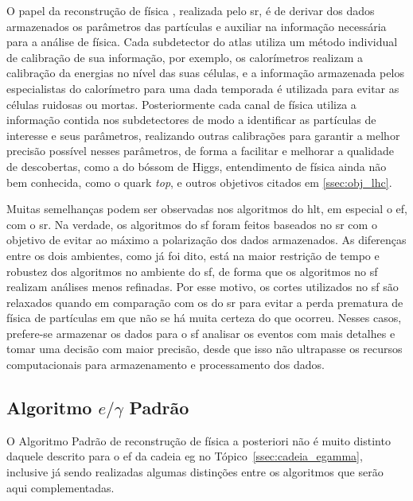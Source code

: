 O papel da reconstrução de física \cite{physics_perf_expected,atlas_computing_tdr}, 
realizada pelo \gls{sr}, é de derivar dos dados armazenados os parâmetros das partículas 
e auxiliar na informação necessária para a análise de física. 
Cada subdetector do \gls{atlas} utiliza um método individual de calibração de
sua informação, por exemplo, os calorímetros realizam a calibração da energias no
nível das suas células, e a informação armazenada pelos especialistas do
calorímetro para uma dada temporada é utilizada para evitar as células ruidosas ou mortas. 
Posteriormente cada canal de física utiliza a informação contida nos
subdetectores de modo a identificar as partículas de interesse e seus
parâmetros, realizando outras calibrações para garantir a melhor precisão
possível nesses parâmetros, de forma a facilitar e melhorar a qualidade de
descobertas, como a do bóssom de Higgs, entendimento de física ainda não bem
conhecida, como o quark \emph{top}, e outros objetivos citados em
\ref{ssec:obj_lhc}.

Muitas semelhanças podem ser observadas nos algoritmos do \gls{hlt}, em especial o
\gls{ef}, com o \gls{sr}. Na verdade, os algoritmos do \gls{sf} foram feitos
baseados no \gls{sr} com o objetivo de evitar ao máximo a polarização dos dados
armazenados. As diferenças entre os dois ambientes, como já foi dito, está na
maior restrição de tempo e robustez dos algoritmos no ambiente do \gls{sf}, de
forma que os algoritmos no \gls{sf} realizam análises menos refinadas. Por esse
motivo, os cortes utilizados no \gls{sf} são relaxados quando em comparação com
os do \gls{sr} para evitar a perda prematura de física de partículas em que não
se há muita certeza do que ocorreu. Nesses casos, prefere-se armazenar os
dados para o \gls{sf} analisar os eventos com mais detalhes e tomar uma decisão
com maior precisão, desde que isso não ultrapasse os recursos computacionais para 
armazenamento e processamento dos dados.

\subsection{\texorpdfstring{Algoritmo $e/\gamma$ Padrão}{Algoritmo eGamma Padrão}}
\label{ssec:egamma}

O Algoritmo Padrão de reconstrução de física a posteriori não é muito distinto
daquele descrito para o \gls{ef} da cadeia \gls{eg} no Tópico~\ref{ssec:cadeia_egamma},
inclusive já sendo realizadas algumas distinções entre os algoritmos que serão
aqui complementadas.

